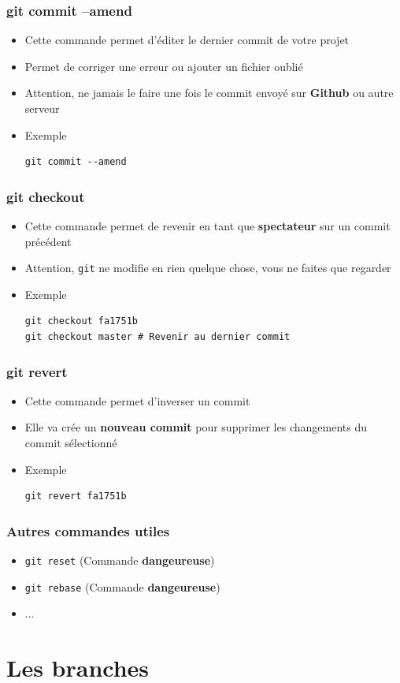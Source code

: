 \documentclass{beamer}
\begin{document}
\begin{frame}[fragile]
\frametitle{git commit --amend}

\begin{itemize}
\item Cette commande permet d'éditer le dernier commit de votre projet
\item Permet de corriger une erreur ou ajouter un fichier oublié
\item Attention, ne jamais le faire une fois le commit envoyé sur \textbf{Github} ou autre serveur
\item Exemple
\begin{lstlisting}
git commit --amend
\end{lstlisting}
\end{itemize}
\end{frame}

\begin{frame}[fragile]
\frametitle{git checkout}

\begin{itemize}
\item Cette commande permet de revenir en tant que \textbf{spectateur} sur un commit précédent
\item Attention, \texttt{git} ne modifie en rien quelque chose, vous ne faites que regarder
\item Exemple
\begin{lstlisting}
git checkout fa1751b
git checkout master # Revenir au dernier commit
\end{lstlisting}
\end{itemize}
\end{frame}

\begin{frame}[fragile]
\frametitle{git revert}

\begin{itemize}
\item Cette commande permet d'inverser un commit
\item Elle va crée un \textbf{nouveau commit} pour supprimer les changements du commit sélectionné
\item Exemple
\begin{lstlisting}
git revert fa1751b
\end{lstlisting}
\end{itemize}
\end{frame}

\begin{frame}[fragile]
\frametitle{Autres commandes utiles}

\begin{itemize}
\item \lstinline{git reset} (Commande \textbf{dangeureuse})
\item \lstinline{git rebase} (Commande \textbf{dangeureuse})
\item ...
\end{itemize}
\end{frame}

\section{Les branches}
\end{document}
